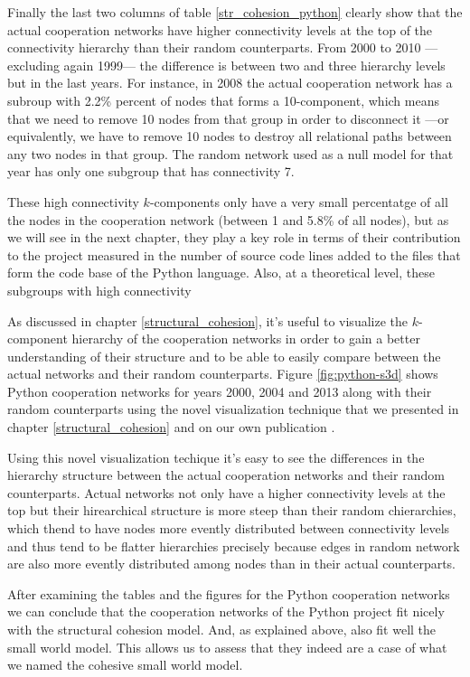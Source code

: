 Finally the last two columns of table \ref{str_cohesion_python} clearly show that the actual cooperation networks have higher connectivity levels at the top of the connectivity hierarchy than their random counterparts. From 2000 to 2010 ---excluding again 1999--- the difference is between two and three hierarchy levels but in the last years. For instance, in 2008 the actual cooperation network has a subroup with 2.2\% percent of nodes that forms a 10-component, which means that we need to remove 10 nodes from that group in order to disconnect it ---or equivalently, we have to remove 10 nodes to destroy all relational paths between any two nodes in that group. The random network used as a null model for that year has only one subgroup that has connectivity 7.

These high connectivity $k$-components only have a very small percentatge of all the nodes in the cooperation network (between 1 and 5.8\% of all nodes), but as we will see in the next chapter, they play a key role in terms of their contribution to the project measured in the number of source code lines added to the files that form the code base of the Python language. Also, at a theoretical level, these subgroups with high connectivity 

As discussed in chapter \ref{structural_cohesion}, it's useful to visualize the $k$-component hierarchy of the cooperation networks in order to gain a better understanding of their structure and to be able to easily compare between the actual networks and their random counterparts. Figure \ref{fig:python-s3d} shows Python cooperation networks for years 2000, 2004 and 2013 along with their random counterparts using the novel visualization technique that we presented in chapter \ref{structural_cohesion} and on our own publication \citep{torrents:2015}.

Using this novel visualization techique it's easy to see the differences in the hierarchy structure between the actual cooperation networks and their random counterparts. Actual networks not only have a higher connectivity levels at the top but their hirearchical structure is more steep than their random chierarchies, which thend to have nodes more evently distributed between connectivity levels and thus tend to be flatter hierarchies precisely because edges in random network are also more evently distributed among nodes than in their actual counterparts.

After examining the tables and the figures for the Python cooperation networks we can conclude that the cooperation networks of the Python project fit nicely with the structural cohesion model. And, as explained above, also fit well the small world model. This allows us to assess that they indeed are a case of what we named the cohesive small world model.

